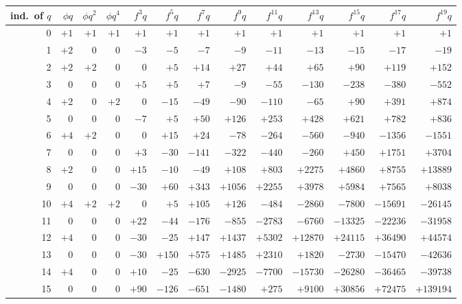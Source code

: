 \documentclass[11pt]{article}
\begin{document}
\begin{table}
\renewcommand{\arraystretch}{0.9}
\centering
\footnotesize
\begin{tabular}{r|r|r|r|r|r|r|r|r|r|r|r|r}
\hline
ind.\ of $q$ & $\phi q$ & $\phi q^2$ & $\phi q^4$ & $f^3 q$ & $f^5 q$ & $f^7 q$ & $f^9 q$ & $f^{11} q$ & $f^{13} q$ & $f^{15} q$ & $f^{17} q$ & $f^{19} q$ \\
\hline
 0 & $+1$ & $+1$ & $+1$ & $+1$ & $+1$ & $+1$ & $+1$ & $+1$ & $+1$ & $+1$ & $+1$ & $+1$ \\
 1 & $+2$ & $0$ & $0$ & $-3$ & $-5$ & $-7$ & $-9$ & $-11$ & $-13$ & $-15$ & $-17$ & $-19$ \\
 2 & $+2$ & $+2$ & $0$ & $0$ & $+5$ & $+14$ & $+27$ & $+44$ & $+65$ & $+90$ & $+119$ & $+152$ \\
 3 & $0$ & $0$ & $0$ & $+5$ & $+5$ & $+7$ & $-9$ & $-55$ & $-130$ & $-238$ & $-380$ & $-552$ \\
 4 & $+2$ & $0$ & $+2$ & $0$ & $-15$ & $-49$ & $-90$ & $-110$ & $-65$ & $+90$ & $+391$ & $+874$ \\
 5 & $0$ & $0$ & $0$ & $-7$ & $+5$ & $+50$ & $+126$ & $+253$ & $+428$ & $+621$ & $+782$ & $+836$ \\
 6 & $+4$ & $+2$ & $0$ & $0$ & $+15$ & $+24$ & $-78$ & $-264$ & $-560$ & $-940$ & $-1356$ & $-1551$ \\
 7 & $0$ & $0$ & $0$ & $+3$ & $-30$ & $-141$ & $-322$ & $-440$ & $-260$ & $+450$ & $+1751$ & $+3704$ \\
 8 & $+2$ & $0$ & $0$ & $+15$ & $-10$ & $-49$ & $+108$ & $+803$ & $+2275$ & $+4860$ & $+8755$ & $+13889$ \\
 9 & $0$ & $0$ & $0$ & $-30$ & $+60$ & $+343$ & $+1056$ & $+2255$ & $+3978$ & $+5984$ & $+7565$ & $+8038$ \\
10 & $+4$ & $+2$ & $+2$ & $0$ & $+5$ & $+105$ & $+126$ & $-484$ & $-2860$ & $-7800$ & $-15691$ & $-26145$ \\
11 & $0$ & $0$ & $0$ & $+22$ & $-44$ & $-176$ & $-855$ & $-2783$ & $-6760$ & $-13325$ & $-22236$ & $-31958$ \\
12 & $+4$ & $0$ & $0$ & $-30$ & $-25$ & $+147$ & $+1437$ & $+5302$ & $+12870$ & $+24115$ & $+36490$ & $+44574$ \\
13 & $0$ & $0$ & $0$ & $-30$ & $+150$ & $+575$ & $+1485$ & $+2310$ & $+1820$ & $-2730$ & $-15470$ & $-42636$ \\
14 & $+4$ & $0$ & $0$ & $+10$ & $-25$ & $-630$ & $-2925$ & $-7700$ & $-15730$ & $-26280$ & $-36465$ & $-39738$ \\
15 & $0$ & $0$ & $0$ & $+90$ & $-126$ & $-651$ & $-1480$ & $+275$ & $+9100$ & $+30856$ & $+72475$ & $+139194$ \\

\end{tabular}
\end{table}
\end{document}

